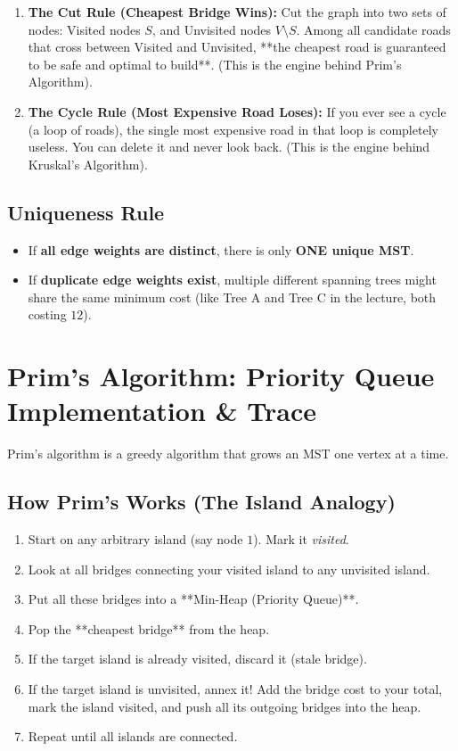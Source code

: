 \documentclass[10pt,journal,compsoc,onecolumn]{IEEEtran}
\begin{document}
\begin{enumerate}
    \item \textbf{The Cut Rule (Cheapest Bridge Wins):}
    Cut the graph into two sets of nodes: Visited nodes $S$, and Unvisited nodes $V \setminus S$. Among all candidate roads that cross between Visited and Unvisited, **the cheapest road is guaranteed to be safe and optimal to build**. (This is the engine behind Prim's Algorithm).
    
    \item \textbf{The Cycle Rule (Most Expensive Road Loses):}
    If you ever see a cycle (a loop of roads), the single most expensive road in that loop is completely useless. You can delete it and never look back. (This is the engine behind Kruskal's Algorithm).
\end{enumerate}

\subsection{Uniqueness Rule}
\begin{itemize}
    \item If \textbf{all edge weights are distinct}, there is only \textbf{ONE unique MST}.
    \item If \textbf{duplicate edge weights exist}, multiple different spanning trees might share the same minimum cost (like Tree A and Tree C in the lecture, both costing $12$).
\end{itemize}

\section{Prim's Algorithm: Priority Queue Implementation \& Trace}
\label{sec:prims_practical}

Prim's algorithm is a greedy algorithm that grows an MST one vertex at a time.

\subsection{How Prim's Works (The Island Analogy)}

\begin{enumerate}
    \item Start on any arbitrary island (say node $1$). Mark it \emph{visited}.
    \item Look at all bridges connecting your visited island to any unvisited island.
    \item Put all these bridges into a **Min-Heap (Priority Queue)**.
    \item Pop the **cheapest bridge** from the heap.
    \item If the target island is already visited, discard it (stale bridge).
    \item If the target island is unvisited, annex it! Add the bridge cost to your total, mark the island visited, and push all its outgoing bridges into the heap.
    \item Repeat until all islands are connected.
\end{enumerate}
\end{document}
